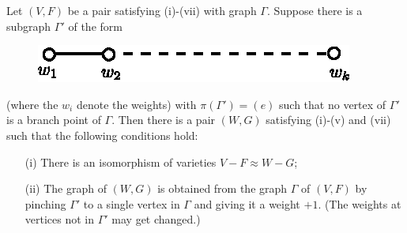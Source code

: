 \begin{lem}\label{art8-lem5}%
Let $(V,F)$ be a pair satisfying (i)-(vii) with graph $\Gamma$. Suppose there is a subgraph $\Gamma'$ of the form
\begin{figure}[H]
\hfill
\includegraphics{fig4.eps} \hfill {}
\end{figure}
\noindent
(where the $w_i$ denote the weights) with $\pi (\Gamma') = (e)$ such that no vertex of $\Gamma'$ is a branch point of $\Gamma$. Then there is a pair $(W,G)$ satisfying (i)-(v) and (vii) such that the following conditions hold:
\begin{itemize}
\item[(i)] There is an isomorphism of varieties $V - F \approx W - G$;

\item[(ii)] The graph of $(W,G)$ is obtained from the graph $\Gamma$ of $(V,F)$ by pinching $\Gamma'$ to a single vertex in $\Gamma$ and giving it a weight $+1$. (The weights at vertices not in $\Gamma'$ may get changed.)
\end{itemize}
\end{lem}

